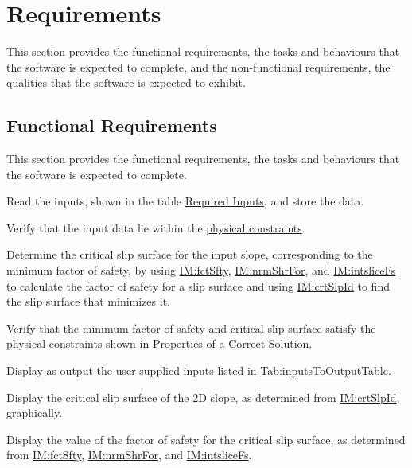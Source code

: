 \documentclass[12pt]{article}
\begin{document}
\section{Requirements}
\label{Sec:Requirements}
This section provides the functional requirements, the tasks and behaviours that the software is expected to complete, and the non-functional requirements, the qualities that the software is expected to exhibit.

\subsection{Functional Requirements}
\label{Sec:FRs}
This section provides the functional requirements, the tasks and behaviours that the software is expected to complete.

\begin{description}[font=\normalfont]
\item[Read-and-Store:\phantomsection\label{readAndStore}]{Read the inputs, shown in the table \hyperref[Table:ReqInputs]{Required Inputs}, and store the data.}
\item[Verify-Input:\phantomsection\label{verifyInput}]{Verify that the input data lie within the \hyperref[Sec:DataConstraints]{physical constraints}.}
\item[Determine-Critical-Slip-Surface:\phantomsection\label{determineCritSlip}]{Determine the critical slip surface for the input slope, corresponding to the minimum factor of safety, by using \hyperref[IM:fctSfty]{IM:fctSfty}, \hyperref[IM:nrmShrFor]{IM:nrmShrFor}, and \hyperref[IM:intsliceFs]{IM:intsliceFs} to calculate the factor of safety for a slip surface and using \hyperref[IM:crtSlpId]{IM:crtSlpId} to find the slip surface that minimizes it.}
\item[Verify-Output:\phantomsection\label{verifyOutput}]{Verify that the minimum factor of safety and critical slip surface satisfy the physical constraints shown in \hyperref[Sec:CorSolProps]{Properties of a Correct Solution}.}
\item[Display-Input:\phantomsection\label{displayInput}]{Display as output the user-supplied inputs listed in \hyperref[Table:inputsToOutputTable]{Tab:inputsToOutputTable}.}
\item[Display-Graph:\phantomsection\label{displayGraph}]{Display the critical slip surface of the 2D slope, as determined from \hyperref[IM:crtSlpId]{IM:crtSlpId}, graphically.}
\item[Display-Factor-of-Safety:\phantomsection\label{displayFS}]{Display the value of the factor of safety for the critical slip surface, as determined from \hyperref[IM:fctSfty]{IM:fctSfty}, \hyperref[IM:nrmShrFor]{IM:nrmShrFor}, and \hyperref[IM:intsliceFs]{IM:intsliceFs}.}

\end{description}
\end{document}
